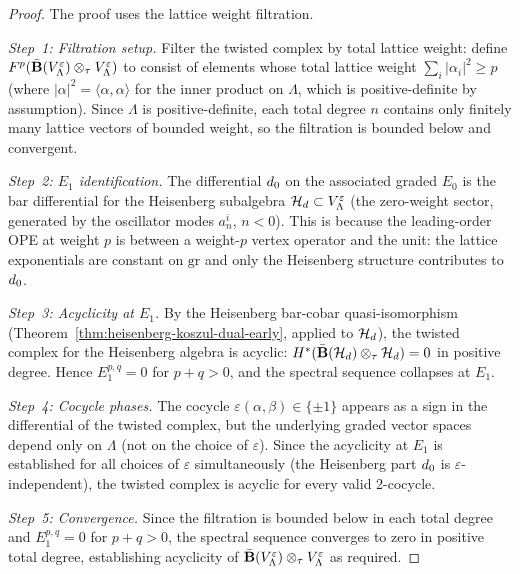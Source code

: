 \begin{proof}
The proof uses the lattice weight filtration.

\emph{Step~1: Filtration setup.}
Filter the twisted complex by total lattice weight: define $F^p(\bar{\mathbf{B}}(V_\Lambda^\varepsilon) \otimes_\tau V_\Lambda^\varepsilon)$ to consist of elements whose total lattice weight $\sum_i |\alpha_i|^2 \geq p$ (where $|\alpha|^2 = \langle\alpha,\alpha\rangle$ for the inner product on $\Lambda$, which is positive-definite by assumption).  Since $\Lambda$ is positive-definite, each total degree $n$ contains only finitely many lattice vectors of bounded weight, so the filtration is bounded below and convergent.

\emph{Step~2: $E_1$ identification.}
The differential $d_0$ on the associated graded $E_0$ is the bar differential for the Heisenberg subalgebra $\mathcal{H}_d \subset V_\Lambda^\varepsilon$ (the zero-weight sector, generated by the oscillator modes $a^i_n$, $n < 0$).  This is because the leading-order OPE at weight $p$ is between a weight-$p$ vertex operator and the unit: the lattice exponentials are constant on $\mathrm{gr}$ and only the Heisenberg structure contributes to $d_0$.

\emph{Step~3: Acyclicity at $E_1$.}
By the Heisenberg bar-cobar quasi-isomorphism (Theorem~\ref{thm:heisenberg-koszul-dual-early}, applied to $\mathcal{H}_d$), the twisted complex for the Heisenberg algebra is acyclic: $H^*(\bar{\mathbf{B}}(\mathcal{H}_d) \otimes_\tau \mathcal{H}_d) = 0$ in positive degree.  Hence $E_1^{p,q} = 0$ for $p+q > 0$, and the spectral sequence collapses at $E_1$.

\emph{Step~4: Cocycle phases.}
The cocycle $\varepsilon(\alpha,\beta) \in \{\pm 1\}$ appears as a sign in the differential of the twisted complex, but the underlying graded vector spaces depend only on $\Lambda$ (not on the choice of $\varepsilon$).  Since the acyclicity at $E_1$ is established for all choices of $\varepsilon$ simultaneously (the Heisenberg part $d_0$ is $\varepsilon$-independent), the twisted complex is acyclic for every valid 2-cocycle.

\emph{Step~5: Convergence.}
Since the filtration is bounded below in each total degree and $E_1^{p,q} = 0$ for $p+q > 0$, the spectral sequence converges to zero in positive total degree, establishing acyclicity of $\bar{\mathbf{B}}(V_\Lambda^\varepsilon) \otimes_\tau V_\Lambda^\varepsilon$ as required.
\end{proof}

